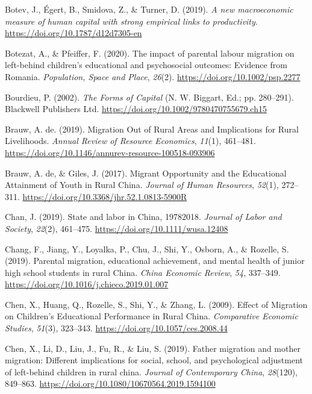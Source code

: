 \documentclass[
  man,floatsintext]{apa7}
\newlength{\cslhangindent}
\newlength{\cslentryspacingunit} %
\newenvironment{CSLReferences}[2] %
 {%
  \setlength{\parindent}{0pt}
  \ifodd #1
  \let\oldpar\par
  \def\par{\hangindent=\cslhangindent\oldpar}
  \fi
  \setlength{\parskip}{#2\cslentryspacingunit}
 }%
 {}
\begin{document}
\begin{CSLReferences}{1}{0}
\leavevmode{}%
Botev, J., Égert, B., Smidova, Z., \& Turner, D. (2019). \emph{A new macroeconomic measure of human capital with strong empirical links to productivity}. \url{https://doi.org/10.1787/d12d7305-en}

\leavevmode{}%
Botezat, A., \& Pfeiffer, F. (2020). The impact of parental labour migration on left{-}behind children's educational and psychosocial outcomes: Evidence from Romania. \emph{Population, Space and Place}, \emph{26}(2). \url{https://doi.org/10.1002/psp.2277}

\leavevmode{}%
Bourdieu, P. (2002). \emph{The Forms of Capital} (N. W. Biggart, Ed.; pp. 280--291). Blackwell Publishers Ltd. \url{https://doi.org/10.1002/9780470755679.ch15}

\leavevmode{}%
Brauw, A. de. (2019). Migration Out of Rural Areas and Implications for Rural Livelihoods. \emph{Annual Review of Resource Economics}, \emph{11}(1), 461--481. \url{https://doi.org/10.1146/annurev-resource-100518-093906}

\leavevmode{}%
Brauw, A. de, \& Giles, J. (2017). Migrant Opportunity and the Educational Attainment of Youth in Rural China. \emph{Journal of Human Resources}, \emph{52}(1), 272--311. \url{https://doi.org/10.3368/jhr.52.1.0813-5900R}

\leavevmode{}%
Chan, J. (2019). State and labor in China, 1978{\textendash}2018. \emph{Journal of Labor and Society}, \emph{22}(2), 461--475. \url{https://doi.org/10.1111/wusa.12408}

\leavevmode{}%
Chang, F., Jiang, Y., Loyalka, P., Chu, J., Shi, Y., Osborn, A., \& Rozelle, S. (2019). Parental migration, educational achievement, and mental health of junior high school students in rural China. \emph{China Economic Review}, \emph{54}, 337--349. \url{https://doi.org/10.1016/j.chieco.2019.01.007}

\leavevmode{}%
Chen, X., Huang, Q., Rozelle, S., Shi, Y., \& Zhang, L. (2009). Effect of Migration on Children's Educational Performance in Rural China. \emph{Comparative Economic Studies}, \emph{51}(3), 323--343. \url{https://doi.org/10.1057/ces.2008.44}

\leavevmode{}%
Chen, X., Li, D., Liu, J., Fu, R., \& Liu, S. (2019). Father migration and mother migration: Different implications for social, school, and psychological adjustment of left-behind children in rural china. \emph{Journal of Contemporary China}, \emph{28}(120), 849--863. \url{https://doi.org/10.1080/10670564.2019.1594100}


\end{CSLReferences}
\end{document}
